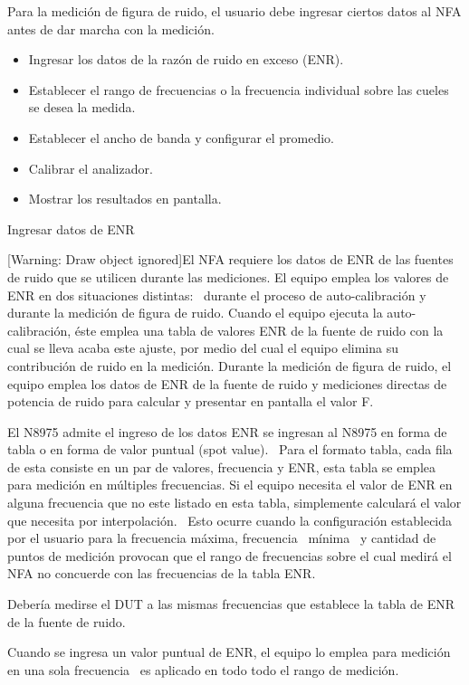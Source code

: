 \documentclass[paper=letter,oneside,fontsize=10pt,parskip=full]{article}
\begin{document}
Para la medición de figura de ruido, el usuario debe ingresar ciertos datos al NFA antes de dar marcha con la medición.

\begin{itemize}
\item Ingresar los datos de la razón de ruido en exceso (ENR).
\item Establecer el rango de frecuencias o la frecuencia individual sobre las cueles se desea la medida.
\item Establecer el ancho de banda y configurar el promedio.
\item Calibrar el analizador.
\item Mostrar los resultados en pantalla.
\end{itemize}
Ingresar datos de ENR

[Warning: Draw object ignored]El NFA requiere los datos de ENR de las fuentes de ruido que se utilicen durante las
mediciones. El equipo emplea los valores de ENR en dos situaciones distintas: \ durante el proceso de auto-calibración
y durante la medición de figura de ruido. Cuando el equipo ejecuta la auto-calibración, éste emplea una tabla de
valores ENR de la fuente de ruido con la cual se lleva acaba este ajuste, por medio del cual el equipo elimina su
contribución de ruido en la medición. Durante la medición de figura de ruido, el equipo emplea los datos de ENR de la
fuente de ruido y mediciones directas de potencia de ruido para calcular y presentar en pantalla el valor F. 

El N8975 admite el ingreso de los datos ENR se ingresan al N8975 en forma de tabla o en forma de valor puntual (spot
value). \ Para el formato tabla, cada fila de esta consiste en un par de valores, frecuencia y ENR, esta tabla se
emplea para medición en múltiples frecuencias. Si el equipo necesita el valor de ENR en alguna frecuencia que no este
listado en esta tabla, simplemente calculará el valor que necesita por interpolación. \ Esto ocurre cuando la
configuración establecida por el usuario para la frecuencia máxima, frecuencia \ mínima \ y cantidad de puntos de
medición provocan que el rango de frecuencias sobre el cual medirá el NFA no concuerde con las frecuencias de la tabla
ENR. 

Debería medirse el DUT a las mismas frecuencias que establece la tabla de ENR de la fuente de ruido.

Cuando se ingresa un valor puntual de ENR, el equipo lo emplea para medición en una sola frecuencia \ es aplicado en
todo todo el rango de medición.
\end{document}
